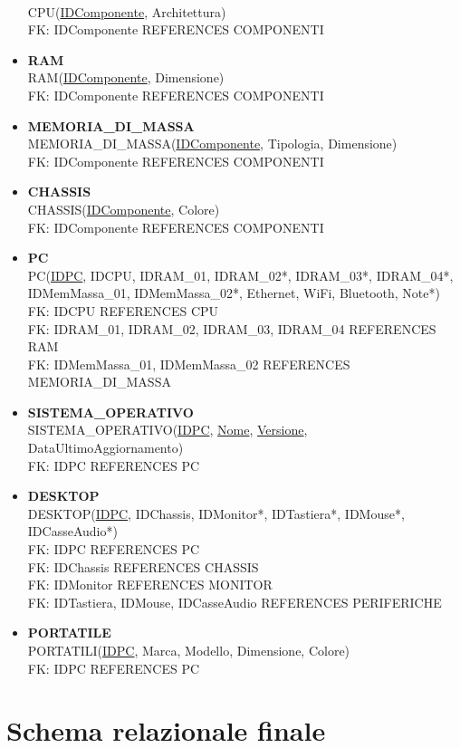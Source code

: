 \documentclass[a4paper,12pt]{report}
\begin{document}
\begin{itemize}
		\\ CPU(\underline{IDComponente}, Architettura)
		\\ FK: IDComponente REFERENCES COMPONENTI
	\item \textbf{RAM}
		\\ RAM(\underline{IDComponente}, Dimensione)
		\\ FK: IDComponente REFERENCES COMPONENTI
	\item \textbf{MEMORIA\_DI\_MASSA}
		\\ MEMORIA\_DI\_MASSA(\underline{IDComponente}, Tipologia, Dimensione)
		\\ FK: IDComponente REFERENCES COMPONENTI
	\item \textbf{CHASSIS}
		\\ CHASSIS(\underline{IDComponente}, Colore)
		\\ FK: IDComponente REFERENCES COMPONENTI
	\item \textbf{PC}
		\\ PC(\underline{IDPC}, IDCPU, IDRAM\_01, IDRAM\_02*, IDRAM\_03*, IDRAM\_04*, IDMemMassa\_01, IDMemMassa\_02*, Ethernet, WiFi, Bluetooth, Note*)
		\\ FK: IDCPU REFERENCES CPU
		\\ FK: IDRAM\_01, IDRAM\_02, IDRAM\_03, IDRAM\_04 REFERENCES RAM
		\\ FK: IDMemMassa\_01, IDMemMassa\_02 REFERENCES MEMORIA\_DI\_MASSA
	\item \textbf{SISTEMA\_OPERATIVO}
		\\ SISTEMA\_OPERATIVO(\underline{IDPC}, \underline{Nome}, \underline{Versione}, DataUltimoAggiornamento)
		\\ FK: IDPC REFERENCES PC
	\item \textbf{DESKTOP}
		\\ DESKTOP(\underline{IDPC}, IDChassis, IDMonitor*, IDTastiera*, IDMouse*, IDCasseAudio*)
		\\ FK: IDPC REFERENCES PC
		\\ FK: IDChassis REFERENCES CHASSIS
		\\ FK: IDMonitor REFERENCES MONITOR
		\\ FK: IDTastiera, IDMouse, IDCasseAudio REFERENCES PERIFERICHE
	\item \textbf{PORTATILE}
		\\ PORTATILI(\underline{IDPC}, Marca, Modello, Dimensione, Colore)
		\\ FK: IDPC REFERENCES PC
\end{itemize}

\section{Schema relazionale finale}
\end{document}
